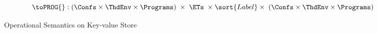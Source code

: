 \begin{figure*}[!t]
\[
	\toPROG{} : 
    ( \Confs \times \ThdEnv \times \Programs) 
    \;\times\; \ETs \;\times \sort{Label} \times \;
    ( \Confs \times \ThdEnv \times \Programs) 
\]
\begin{mathpar}
\end{mathpar}
%
\hrulefill
\caption{Operational Semantics on Key-value Store}
\label{fig:transaction_semantics}
\label{def:thread_semantics}
\label{fig:thread_semantics}
\label{def:thread_pool_semantics}
\label{fig:thread_pool_semantics}
\label{def:program_semantics}
\label{fig:program_semantics}
\label{fig:full-semantics}
\end{figure*}

